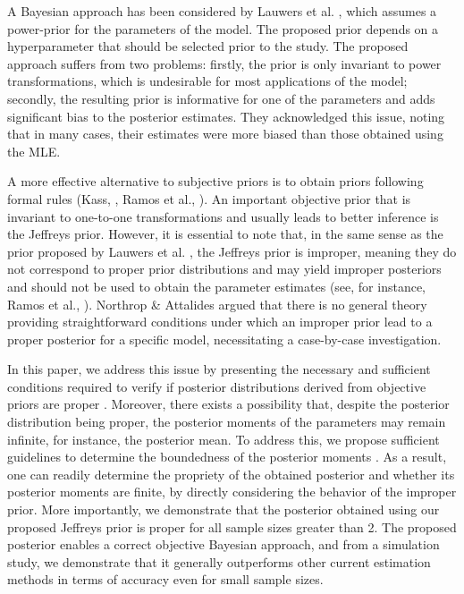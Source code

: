 \documentclass[12pt]{interact}
\theoremstyle{plain}%
\theoremstyle{definition}
\theoremstyle{remark}
\begin{document}
A Bayesian approach has been considered by Lauwers et al. \cite{lauwers2009estimating}, which assumes a power-prior for the parameters of the model. The proposed prior depends on a hyperparameter that should be selected prior to the study. The proposed approach suffers from two problems: firstly, the prior is only invariant to power transformations, which is undesirable for most applications of the model; secondly, the resulting prior is informative for one of the parameters and adds significant bias to the posterior estimates. They acknowledged this issue, noting that in many cases, their estimates were more biased than those obtained using the MLE.

A more effective alternative to subjective priors is to obtain priors following formal rules (Kass, \cite{kass1996selection}, Ramos et al., \cite{ramos2016efficient}). An important objective prior that is invariant to one-to-one transformations and usually leads to better inference is the Jeffreys \cite{jeffreys1946invariant} prior. However, it is essential to note that, in the same sense as the prior proposed by Lauwers et al. \cite{lauwers2009estimating}, the Jeffreys prior is improper, meaning they do not correspond to proper prior distributions and may yield improper posteriors and should not be used to obtain the parameter estimates (see, for instance, Ramos et al., \cite{ramos2023power}).
Northrop \& Attalides \cite{northrop2016} argued that there is no general theory providing straightforward conditions under which an improper prior lead to a proper posterior for a specific model, necessitating a case-by-case investigation.

In this paper, we address this issue by presenting the necessary and sufficient conditions required to verify if posterior distributions derived from objective priors are proper \cite{ferreira2020objective,ramos2021bayesian}. Moreover, there exists a possibility that, despite the posterior distribution being proper, the posterior moments of the parameters may remain infinite, for instance, the posterior mean. To address this, we propose sufficient guidelines to determine the boundedness of the posterior moments \cite{ramos2020posterior}. As a result, one can readily determine the propriety of the obtained posterior and whether its posterior moments are finite, by directly considering the behavior of the improper prior. More importantly, we demonstrate that the posterior obtained using our proposed Jeffreys prior is proper for all sample sizes greater than 2. The proposed posterior enables a correct objective Bayesian approach, and from a simulation study, we demonstrate that it generally outperforms other current estimation methods in terms of accuracy even for small sample sizes.
\end{document}
